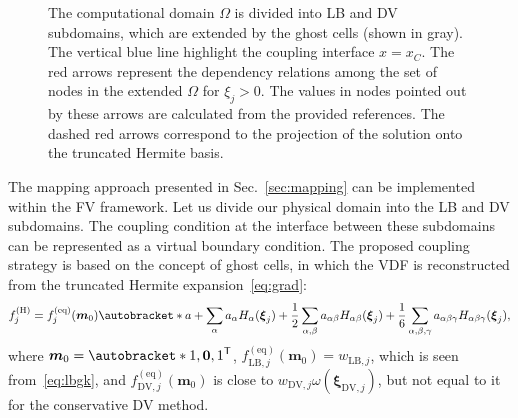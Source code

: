 \documentclass{elsarticle} %
\newcommand{\transpose}[1]{#1^\mathsf{T}}
\DeclarePairedDelimiter\autobracket()       %
\newcommand{\br}[1]{\autobracket*{#1}}
\newcommand{\bxi}{\boldsymbol{\xi}}
\newcommand{\bm}{\boldsymbol{m}}
\newcommand{\equil}[1]{#1^\mathrm{(eq)}}
\newcommand{\hermite}[1]{#1^\mathrm{(H)}}
\newcommand{\LB}{\mathrm{LB}}
\newcommand{\DV}{\mathrm{DV}}
\newcommand{\Aa}{a_{\alpha}}
\newcommand{\Aab}{a_{\alpha\beta}}
\newcommand{\Aabg}{a_{\alpha\beta\gamma}}
\newcommand{\Ha}{H_{\alpha}}
\newcommand{\Hab}{H_{\alpha\beta}}
\newcommand{\Habg}{H_{\alpha\beta\gamma}}
\begin{document}
\begin{figure}
    \caption{
        The computational domain \(\Omega\) is divided into LB and DV subdomains,
        which are extended by the ghost cells (shown in gray).
        The vertical blue line highlight the coupling interface \(x=x_C\).
        The red arrows represent the dependency relations
        among the set of nodes in the extended \(\Omega\) for \(\xi_j>0\).
        The values in nodes pointed out by these arrows are calculated from the provided references.
        The dashed red arrows correspond to the projection of the solution onto the truncated Hermite basis.
    }
    \label{fig:coupling_scheme}
\end{figure}

The mapping approach presented in Sec.~\ref{sec:mapping} can be implemented within the FV framework.
Let us divide our physical domain into the LB and DV subdomains.
The coupling condition at the interface between these subdomains can be represented as a virtual boundary condition.
The proposed coupling strategy is based on the concept of ghost cells,
in which the VDF is reconstructed from the truncated Hermite expansion~\eqref{eq:grad}:
\begin{equation}\label{eq:discrete_grad}
    \hermite{f}_j = \equil{f}_j( \bm_0 ) \br{ a
        + \sum_{\alpha} \Aa \Ha(\bxi_j)
        + \frac12 \sum_{\alpha,\beta} \Aab \Hab(\bxi_j)
        + \frac16 \sum_{\alpha,\beta,\gamma} \Aabg \Habg(\bxi_j)
    },
\end{equation}
where \(\bm_0 = \transpose{\br{1, \boldsymbol{0}, 1}}\),
\(\equil{f}_{\LB,j}(\bm_0) = w_{\LB,j}\), which is seen from~\eqref{eq:lbgk},
and \(\equil{f}_{\DV,j}(\bm_0)\) is close to \(w_{\DV,j}\omega(\bxi_{\DV,j})\),
but not equal to it for the conservative DV method.
\end{document}

